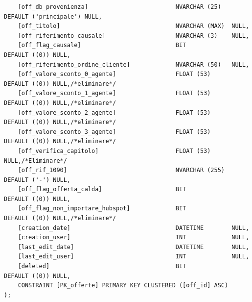 \documentclass[12pt]{article}
\begin{document}
\begin{lstlisting}
    [off_db_provenienza]                         NVARCHAR (25)   DEFAULT ('principale') NULL,
    [off_titolo]                                 NVARCHAR (MAX)  NULL,
    [off_riferimento_causale]                    NVARCHAR (3)    NULL,
    [off_flag_causale]                           BIT             DEFAULT ((0)) NULL,
    [off_riferimento_ordine_cliente]             NVARCHAR (50)   NULL,
    [off_valore_sconto_0_agente]                 FLOAT (53)      DEFAULT ((0)) NULL,/*eliminare*/
    [off_valore_sconto_1_agente]                 FLOAT (53)      DEFAULT ((0)) NULL,/*eliminare*/
    [off_valore_sconto_2_agente]                 FLOAT (53)      DEFAULT ((0)) NULL,/*eliminare*/
    [off_valore_sconto_3_agente]                 FLOAT (53)      DEFAULT ((0)) NULL,/*eliminare*/
    [off_verifica_capitolo]                      FLOAT (53)      NULL,/*Eliminare*/
    [off_rif_1090]                               NVARCHAR (255)  DEFAULT ('-') NULL,
    [off_flag_offerta_calda]                     BIT             DEFAULT ((0)) NULL,
    [off_flag_non_importare_hubspot]             BIT             DEFAULT ((0)) NULL,/*eliminare*/
    [creation_date]                              DATETIME        NULL,
    [creation_user]                              INT             NULL,
    [last_edit_date]                             DATETIME        NULL,
    [last_edit_user]                             INT             NULL,
    [deleted]                                    BIT             DEFAULT ((0)) NULL,
    CONSTRAINT [PK_offerte] PRIMARY KEY CLUSTERED ([off_id] ASC)
);
\end{lstlisting}
\end{document}
